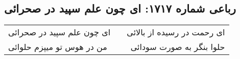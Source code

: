 \begin{center}
\section*{رباعی شماره ۱۷۱۷: ای چون علم سپید در صحرائی}
\label{sec:1717}
\begin{longtable}{l p{0.5cm} r}
ای چون علم سپید در صحرائی
&&
ای رحمت در رسیده از بالائی
\\
من در هوس تو میپزم حلوائی
&&
حلوا بنگر به صورت سودائی
\\
\end{longtable}
\end{center}
